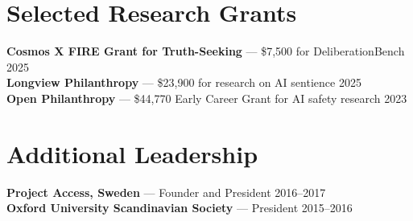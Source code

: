 \documentclass[11pt,letterpaper]{article}
\begin{document}
\section{Selected Research Grants}
\textbf{Cosmos X FIRE Grant for Truth-Seeking} --- \$7,500 for DeliberationBench \hfill 2025\\
\textbf{Longview Philanthropy} --- \$23,900 for research on AI sentience \hfill 2025\\
\textbf{Open Philanthropy} --- \$44,770 Early Career Grant for AI safety research \hfill 2023

\section{Additional Leadership}
\textbf{Project Access, Sweden} --- Founder and President \hfill 2016--2017\\
\textbf{Oxford University Scandinavian Society} --- President \hfill 2015--2016
\end{document}
